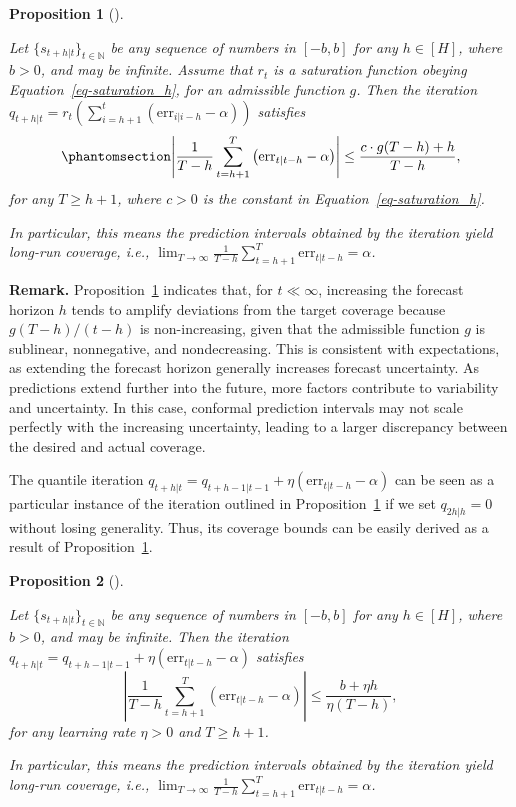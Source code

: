 \documentclass[
  11pt,
  a4paper,
]{article}
\theoremstyle{plain}
\newtheorem{proposition}{Proposition}[section]
\theoremstyle{remark}
\begin{document}
\begin{proposition}[]\protect\hypertarget{prp-cov_rt}{}\label{prp-cov_rt}

Let \(\{s_{t+h|t}\}_{t\in\mathbb{N}}\) be any sequence of numbers in
\([-b, b]\) for any \(h\in[H]\), where \(b>0\), and may be infinite.
Assume that \(r_t\) is a saturation function obeying
Equation~\ref{eq-saturation_h}, for an admissible function \(g\). Then
the iteration
\(q_{t+h|t}=r_t\left(\sum_{i=h+1}^t\left(\mathrm{err}_{i|i-h}-\alpha\right)\right)\)
satisfies \begin{equation}\phantomsection\label{eq-cov_rt}{
\left|\frac{1}{T-h}\sum_{t=h+1}^{T}\left(\mathrm{err}_{t|t-h}-\alpha\right)\right| \leq \frac{c \cdot g(T-h) + h}{T-h},
}\end{equation} for any \(T \geq h+1\), where \(c>0\) is the constant in
Equation~\ref{eq-saturation_h}.

In particular, this means the prediction intervals obtained by the
iteration yield long-run coverage, i.e.,
\(\lim _{T \rightarrow \infty} \frac{1}{T-h} \sum_{t=h+1}^T \mathrm{err}_{t|t-h} = \alpha\).

\end{proposition}

\textbf{Remark.} Proposition~\ref{prp-cov_rt} indicates that, for
\(t \ll \infty\), increasing the forecast horizon \(h\) tends to amplify
deviations from the target coverage because \(g(T-h)/(t-h)\) is
non-increasing, given that the admissible function \(g\) is sublinear,
nonnegative, and nondecreasing. This is consistent with expectations, as
extending the forecast horizon generally increases forecast uncertainty.
As predictions extend further into the future, more factors contribute
to variability and uncertainty. In this case, conformal prediction
intervals may not scale perfectly with the increasing uncertainty,
leading to a larger discrepancy between the desired and actual coverage.

The quantile iteration
\(q_{t+h|t}=q_{t+h-1|t-1}+\eta \left(\mathrm{err}_{t|t-h}-\alpha\right)\)
can be seen as a particular instance of the iteration outlined in
Proposition~\ref{prp-cov_rt} if we set \(q_{2h|h}=0\) without losing
generality. Thus, its coverage bounds can be easily derived as a result
of Proposition~\ref{prp-cov_rt}.

\begin{proposition}[]\protect\hypertarget{prp-cov_qt}{}\label{prp-cov_qt}

Let \(\{s_{t+h|t}\}_{t\in\mathbb{N}}\) be any sequence of numbers in
\([-b, b]\) for any \(h\in[H]\), where \(b>0\), and may be infinite.
Then the iteration
\(q_{t+h|t}=q_{t+h-1|t-1}+\eta \left(\mathrm{err}_{t|t-h}-\alpha\right)\)
satisfies \[
\left|\frac{1}{T-h}\sum_{t=h+1}^{T}\left(\mathrm{err}_{t|t-h}-\alpha\right)\right| \leq \frac{b + \eta h}{\eta\left(T-h\right)},
\] for any learning rate \(\eta > 0\) and \(T \geq h+1\).

In particular, this means the prediction intervals obtained by the
iteration yield long-run coverage, i.e.,
\(\lim _{T \rightarrow \infty} \frac{1}{T-h} \sum_{t=h+1}^T \mathrm{err}_{t|t-h} = \alpha\).

\end{proposition}
\end{document}
